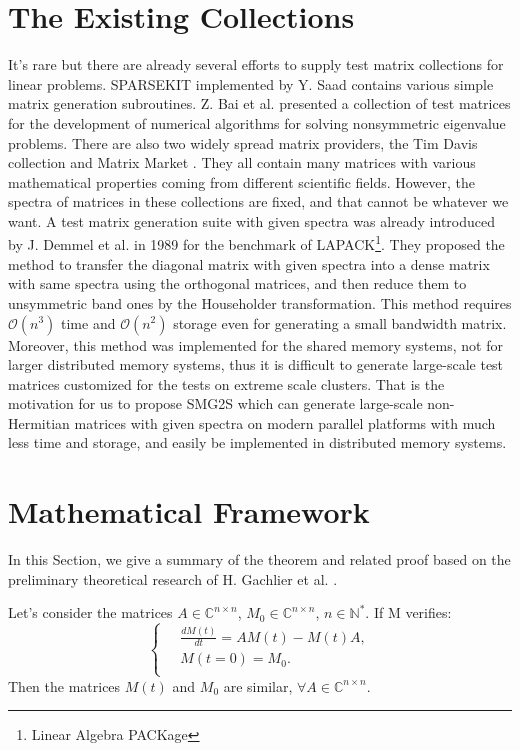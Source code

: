 \section{The Existing Collections} \label{Existing Collections}

It's rare but there are already several efforts to supply test matrix collections for linear problems. SPARSEKIT \cite{saad1994sparsekit} implemented by Y. Saad contains various simple matrix generation subroutines. Z. Bai et al. \cite{bai1996test} presented a collection of test matrices for the development of numerical algorithms for solving nonsymmetric eigenvalue problems. There are also two widely spread matrix providers, the Tim Davis collection \cite{davis2011university} and Matrix Market \cite{boisvert1997matrix}. They all contain many matrices with various mathematical properties coming from different scientific fields. However, the spectra of matrices in these collections are fixed, and that cannot be whatever we want. A test matrix generation suite with given spectra was already introduced by J. Demmel et al. \cite{demmel1989test} in 1989 for the benchmark of LAPACK\footnote{Linear Algebra PACKage}. They proposed the method to transfer the diagonal matrix with given spectra into a dense matrix with same spectra using the orthogonal matrices, and then reduce them to unsymmetric band ones by the Householder transformation. This method requires $\mathcal{O}(n^3)$ time and $\mathcal{O}(n^2)$ storage even for generating a small bandwidth matrix. Moreover, this method was implemented for the shared memory systems, not for larger distributed memory systems, thus it is difficult to generate large-scale test matrices customized for the tests on extreme scale clusters. That is the motivation for us to propose SMG2S which can generate large-scale non-Hermitian matrices with given spectra on modern parallel platforms with much less time and storage, and easily be implemented in distributed memory systems.

\section{Mathematical Framework}

In this Section, we give a summary of the theorem and related proof based on the preliminary theoretical research of H. Gachlier et al. \cite{galichergenerate}.


\begin{theorem}
	\label{theo1}
	Let's consider the matrices $A \in \mathbb{C}^{n \times n}$, $M_0  \in \mathbb{C}^{n \times n}$, $n \in \mathbb{N}^*$. If M verifies: 
	\[
	\left\{\
	\begin{aligned}
	&\frac{dM(t)}{dt} = AM(t) - M(t)A, \\
	&M(t=0) = M_0. \\ 
	\end{aligned}
	\right.
	\]
	Then the matrices $M(t)$ and $M_0$ are similar, $\forall A \in \mathbb{C}^{n \times n}$. 
\end{theorem}

